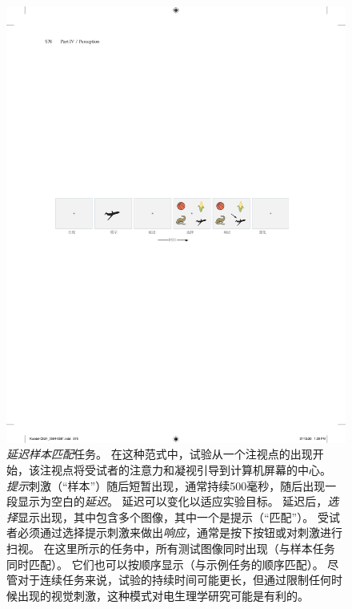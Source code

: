 \begin{figure}[htbp]
	\centering
	\includegraphics[width=1.0\linewidth]{chap24/fig_24_10_A}
	\caption{\textit{延迟样本匹配}任务。
		在这种范式中，试验从一个注视点的出现开始，该注视点将受试者的注意力和凝视引导到计算机屏幕的中心。
		\textit{提示}刺激（“样本”）随后短暂出现，通常持续500毫秒，随后出现一段显示为空白的\textit{延迟}。
		延迟可以变化以适应实验目标。
		延迟后，\textit{选择}显示出现，其中包含多个图像，其中一个是提示（“匹配”）。
		受试者必须通过选择提示刺激来做出\textit{响应}，通常是按下按钮或对刺激进行扫视。
		在这里所示的任务中，所有测试图像同时出现（与样本任务同时匹配）。
		它们也可以按顺序显示（与示例任务的顺序匹配）。
		尽管对于连续任务来说，试验的持续时间可能更长，但通过限制任何时候出现的视觉刺激，这种模式对电生理学研究可能是有利的。}
	\label{fig:24_10_a}
\end{figure}


